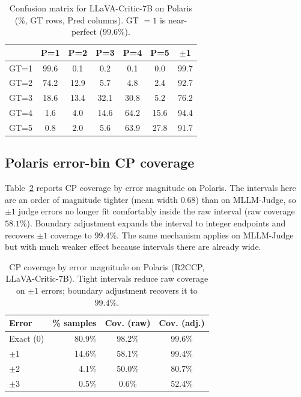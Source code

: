 \documentclass{article}
\begin{document}
\begin{table}[t]
\centering
\caption{Confusion matrix for LLaVA-Critic-7B on Polaris (\%, GT rows, Pred columns). GT $= 1$ is near-perfect (99.6\%).}
\label{tab:polaris_confusion}
\small
\begin{tabular}{l|ccccc|c}
\toprule
& \textbf{P=1} & \textbf{P=2} & \textbf{P=3} & \textbf{P=4} & \textbf{P=5} & $\pm$\textbf{1} \\
\midrule
GT=1 & 99.6 & 0.1 & 0.2 & 0.1 & 0.0 & 99.7 \\
GT=2 & 74.2 & 12.9 & 5.7 & 4.8 & 2.4 & 92.7 \\
GT=3 & 18.6 & 13.4 & 32.1 & 30.8 & 5.2 & 76.2 \\
GT=4 & 1.6 & 4.0 & 14.6 & 64.2 & 15.6 & 94.4 \\
GT=5 & 0.8 & 2.0 & 5.6 & 63.9 & 27.8 & 91.7 \\
\bottomrule
\end{tabular}
\end{table}

\subsection{Polaris error-bin CP coverage}

Table~\ref{tab:polaris_error_bins} reports CP coverage by error magnitude on Polaris. The intervals here are an order of magnitude tighter (mean width $0.68$) than on MLLM-Judge, so $\pm 1$ judge errors no longer fit comfortably inside the raw interval (raw coverage $58.1\%$). Boundary adjustment expands the interval to integer endpoints and recovers $\pm 1$ coverage to $99.4\%$. The same mechanism applies on MLLM-Judge but with much weaker effect because intervals there are already wide.

\begin{table}[t]
\centering
\caption{CP coverage by error magnitude on Polaris (R2CCP, LLaVA-Critic-7B). Tight intervals reduce raw coverage on $\pm 1$ errors; boundary adjustment recovers it to $99.4\%$.}
\label{tab:polaris_error_bins}
\small
\begin{tabular}{lrcc}
\toprule
\textbf{Error} & \textbf{\% samples} & \textbf{Cov. (raw)} & \textbf{Cov. (adj.)} \\
\midrule
Exact (0) & 80.9\% & 98.2\% & 99.6\% \\
$\pm 1$ & 14.6\% & 58.1\% & 99.4\% \\
$\pm 2$ & 4.1\% & 50.0\% & 80.7\% \\
$\pm 3$ & 0.5\% & 0.6\% & 52.4\% \\
\bottomrule
\end{tabular}
\end{table}
\end{document}
